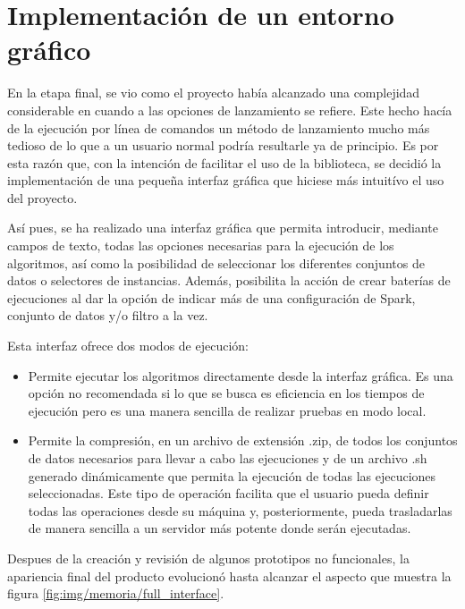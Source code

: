 

\section{Implementación de un entorno gráfico}

En la etapa final, se vio como el proyecto había alcanzado una complejidad considerable en cuando a las opciones de lanzamiento se refiere. Este hecho hacía de la ejecución por línea de comandos un método de lanzamiento mucho más tedioso de lo que a un usuario normal podría resultarle ya de principio. Es por esta razón que, con la intención de facilitar el uso de la biblioteca, se decidió la implementación de una pequeña interfaz gráfica que hiciese más intuitívo el uso del proyecto.

Así pues, se ha realizado una interfaz gráfica que permita introducir, mediante campos de texto, todas las opciones necesarias para la ejecución de los algoritmos, así como la posibilidad de seleccionar los diferentes conjuntos de datos o selectores de instancias. Además, posibilita la acción de crear baterías de ejecuciones al dar la opción de indicar más de una configuración de Spark, conjunto de datos y/o filtro a la vez.

Esta interfaz ofrece dos modos de ejecución:

\begin{itemize}
\item Permite ejecutar los algoritmos directamente desde la interfaz gráfica. Es una opción no recomendada si lo que se busca es eficiencia en los tiempos de ejecución pero es una manera sencilla de realizar pruebas en modo local.
\item Permite la compresión, en un archivo de extensión .zip, de todos los conjuntos de datos necesarios para llevar a cabo las ejecuciones y de un archivo .sh generado dinámicamente que permita la ejecución de todas las ejecuciones seleccionadas. Este tipo de operación facilita que el usuario pueda definir todas las operaciones desde su máquina y, posteriormente, pueda trasladarlas de manera sencilla a un servidor más potente donde serán ejecutadas.
\end{itemize}

Despues de la creación y revisión de algunos prototipos no funcionales, la apariencia final del producto evolucionó hasta alcanzar el aspecto que muestra la figura \ref{fig:img/memoria/full_interface}.


